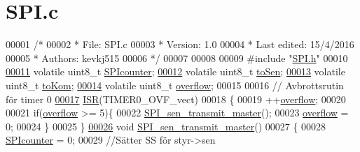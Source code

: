 \hypertarget{_s_p_i_8c_source}{}\section{S\+P\+I.\+c}
\label{_s_p_i_8c_source}

\begin{DoxyCode}
00001 \textcolor{comment}{/*}
00002 \textcolor{comment}{ *        File: SPI.c}
00003 \textcolor{comment}{ *     Version: 1.0}
00004 \textcolor{comment}{ * Last edited: 15/4/2016 }
00005 \textcolor{comment}{ * Authors: kevkj515}
00006 \textcolor{comment}{ */} 
00007 
00008 
00009 \textcolor{preprocessor}{#include "\hyperlink{_s_p_i_8h}{SPI.h}"}
00010 
\hypertarget{_s_p_i_8c_source.tex_l00011}{}\hyperlink{_s_p_i_8c_a65d46084e88aa717b668dffbbda1bf3b}{00011} \textcolor{keyword}{volatile} uint8\_t \hyperlink{_s_p_i_8c_a65d46084e88aa717b668dffbbda1bf3b}{SPIcounter};
\hypertarget{_s_p_i_8c_source.tex_l00012}{}\hyperlink{_s_p_i_8c_a877332cdcfad9d61a433fda50f5fb1b5}{00012} \textcolor{keyword}{volatile} uint8\_t \hyperlink{_s_p_i_8c_a877332cdcfad9d61a433fda50f5fb1b5}{toSen};
\hypertarget{_s_p_i_8c_source.tex_l00013}{}\hyperlink{_s_p_i_8c_ae9f07651aa8c38a27c260082879ab9b2}{00013} \textcolor{keyword}{volatile} uint8\_t \hyperlink{_s_p_i_8c_ae9f07651aa8c38a27c260082879ab9b2}{toKom};
\hypertarget{_s_p_i_8c_source.tex_l00014}{}\hyperlink{_s_p_i_8c_a153ce55af60458b262b041d44bfe9350}{00014} \textcolor{keyword}{volatile} uint8\_t \hyperlink{_s_p_i_8c_a153ce55af60458b262b041d44bfe9350}{overflow};
00015 
00016 \textcolor{comment}{// Avbrottsrutin för timer 0}
\hypertarget{_s_p_i_8c_source.tex_l00017}{}\hyperlink{_s_p_i_8c_add2d7cdddfb682dcc0391e60cf42c7d6}{00017} \hyperlink{_s_p_i_8c_add2d7cdddfb682dcc0391e60cf42c7d6}{ISR}(TIMER0\_OVF\_vect)
00018 \{
00019     ++\hyperlink{_s_p_i_8c_a153ce55af60458b262b041d44bfe9350}{overflow};
00020     
00021     \textcolor{keywordflow}{if}(\hyperlink{_s_p_i_8c_a153ce55af60458b262b041d44bfe9350}{overflow} >= 5)\{
00022         \hyperlink{_s_p_i_8c_aef55913736b574735fdfca21de557988}{SPI\_sen\_transmit\_master}();
00023         \hyperlink{_s_p_i_8c_a153ce55af60458b262b041d44bfe9350}{overflow} = 0;
00024     \}
00025 \}
\hypertarget{_s_p_i_8c_source.tex_l00026}{}\hyperlink{_s_p_i_8h_aef55913736b574735fdfca21de557988}{00026} \textcolor{keywordtype}{void} \hyperlink{_s_p_i_8c_aef55913736b574735fdfca21de557988}{SPI\_sen\_transmit\_master}()
00027 \{
00028     \hyperlink{_s_p_i_8c_a65d46084e88aa717b668dffbbda1bf3b}{SPIcounter} = 0;
00029     \textcolor{comment}{//Sätter SS för styr->sen}

\end{DoxyCode}

